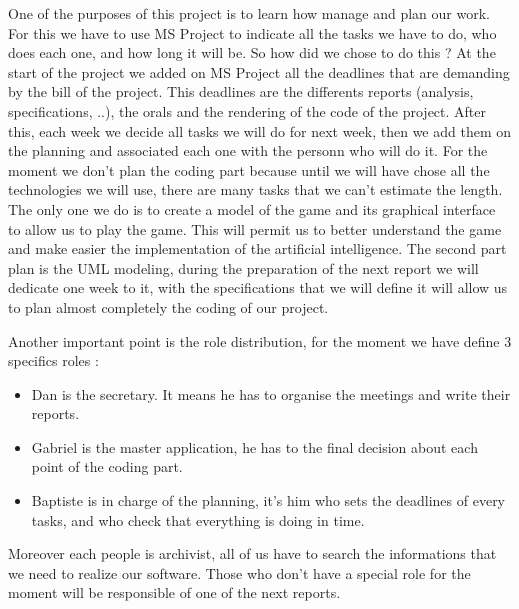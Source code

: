 One of the purposes of this project is to learn how manage and plan our work. For this we have to use MS Project to indicate all the tasks we have to do, who does each one, and how long it will be.  So how did we chose to do this ?
\newline
\newline
At the start of the project we added on MS Project all the deadlines that are demanding by the bill of the project. This deadlines are the differents reports (analysis, specifications, ..), the orals and the rendering of the code of the project. After this, each week we decide all tasks we will do for next week, then we add them on the planning and associated each one with the personn who will do it.
\newline
\newline
For the moment we don't plan the coding part because until we will have chose all the technologies we will use, there are many tasks that we can't estimate the length. The only one we do is to create a model of the game and its graphical interface to allow us to play the game. This will permit us to better understand the game and make easier the implementation of the artificial intelligence.
\newline
\newline
The second part plan is the UML modeling, during the preparation of the next report we will dedicate one week to it, with the specifications that we will define it will allow us to plan almost completely the coding of our project.
\newline
\newline

Another important point is the role distribution, for the moment we have define 3 specifics roles : 
\begin{itemize}
\item  Dan is the secretary. It means he has to organise the meetings and write their reports.
\item Gabriel is the master application, he has to the final decision about each point of the coding part.
\item Baptiste is in charge of the planning, it's him who sets the deadlines of every tasks, and who check that everything is doing in time.
\end{itemize}
Moreover each people is archivist, all of us have to search the informations that we need to realize our software. Those who don't have a special role for the moment will be responsible of one of the next reports.
